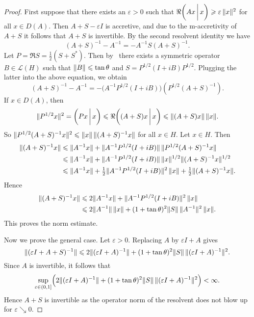 \documentclass[a4paper,oneside,12pt]{amsart}
\theoremstyle{plain}
\theoremstyle{definition}
\let\le=\leqslant
\let\ge=\geqslant
\DeclarePairedDelimiter\norm{\lVert}{\rVert}
\begin{document}
\begin{proof}
First suppose that there exists an ${\varepsilon}>0$ such that 
$\Re{{\ifthenelse{\equal{auto}{auto}}{\left({Ax}\mkern3mu{\biggm|}\mkern3mu {x}\right)}{}
\ifthenelse{\equal{auto}{b}}{\bigl({Ax}\mkern3mu{\biggm|}\mkern3mu {x}\bigr)}{}
\ifthenelse{\equal{auto}{B}}{\Bigl({Ax}\mkern3mu{\bigm|}\mkern3mu {x}\Bigr)}{}
}}\ge {\varepsilon} \,\norm{x}^2$ for all $x\in D(A)$.
Then $A+S-{\varepsilon} I$ is accretive, and due to the {\ensuremath{\text{m}}}-accretivity of $A+S$ it
follows that $A+S$ is invertible.
By the second resolvent identity we have
\[
    (A+S)^{-1}- A^{-1} = - A^{-1} S (A+S)^{-1}.
\]
Let $P=\Re S = \tfrac{1}{2}(S+S^*)$.
Then by~\cite[Theorem~VI.3.2]{Kat1} there exists a symmetric operator $B\in{\mathcal{L}}(H)$ such that $\norm{B}\le\tan\theta$ and $S=P^{1/2}(I+iB)P^{1/2}$.
Plugging the latter into the above equation, we obtain
\[
    (A+S)^{-1}-A^{-1} = - \bigl(A^{-1} P^{1/2}(I+iB)\bigr) (P^{1/2} (A+S)^{-1}).
\]
If $x \in D(A)$, then 
\[
    \norm{P^{1/2} x}^2 = {{\ifthenelse{\equal{auto}{auto}}{\left({Px}\mkern3mu{\biggm|}\mkern3mu {x}\right)}{}
\ifthenelse{\equal{auto}{b}}{\bigl({Px}\mkern3mu{\biggm|}\mkern3mu {x}\bigr)}{}
\ifthenelse{\equal{auto}{B}}{\Bigl({Px}\mkern3mu{\bigm|}\mkern3mu {x}\Bigr)}{}
}} \le \Re{{\ifthenelse{\equal{auto}{auto}}{\left({(A+S)x}\mkern3mu{\biggm|}\mkern3mu {x}\right)}{}
\ifthenelse{\equal{auto}{b}}{\bigl({(A+S)x}\mkern3mu{\biggm|}\mkern3mu {x}\bigr)}{}
\ifthenelse{\equal{auto}{B}}{\Bigl({(A+S)x}\mkern3mu{\bigm|}\mkern3mu {x}\Bigr)}{}
}} \le \norm{(A+S)x}\,\norm{x}.
\]
So $\norm{P^{1/2} (A+S)^{-1}x}^2 \le\norm{x}\,\norm{(A+S)^{-1} x}$ for all $x \in H$.
Let $x \in H$. Then 
\begin{align*}
\norm{(A+S)^{-1} x}
    & \le \norm{A^{-1} x} + \norm{A^{-1} P^{1/2}(I+iB)} \, \norm{P^{1/2} (A+S)^{-1} x}  \\
    & \le \norm{A^{-1} x} + \norm{A^{-1} P^{1/2}(I+iB)} \, \norm{x}^{1/2} \norm{(A+S)^{-1} x}^{1/2}  \\
    & \le \norm{A^{-1} x} + \tfrac{1}{2} \norm{A^{-1} P^{1/2}(I+iB)}^2 \, \norm{x} + \tfrac{1}{2} \norm{(A+S)^{-1} x}.
\end{align*}
Hence 
\begin{align*}
    \norm{(A+S)^{-1} x} &\le 2 \norm{A^{-1} x} + \norm{A^{-1} P^{1/2}(I+iB)}^2 \, \norm{x} \\
    &\le 2 \norm{A^{-1}} \, \norm{x} + (1+\tan\theta)^2\norm{S} \, \norm{A^{-1}}^2 \, \norm{x}.
\end{align*}
This proves the norm estimate.
 
Now we prove the general case. Let ${\varepsilon} > 0$.
Replacing $A$ by ${\varepsilon} I + A$ gives
\[
    \norm{({\varepsilon} I + A + S)^{-1}} \le 2 \norm{({\varepsilon} I + A )^{-1}} + (1+\tan\theta)^2\norm{S}\,\norm{({\varepsilon} I + A )^{-1}}^2.
\]
Since $A$ is invertible, it follows that 
\[
    \sup_{{\varepsilon}\in (0,1]} \Bigl(2 \norm{({\varepsilon} I + A )^{-1}} + (1+\tan\theta)^2\norm{S}\,\norm{({\varepsilon} I + A )^{-1}}^2\Bigr) < \infty.
\]
Hence $A + S$ is invertible as the operator norm of the resolvent does not blow up for ${\varepsilon}{\searrow} 0$.
\end{proof}
\end{document}
